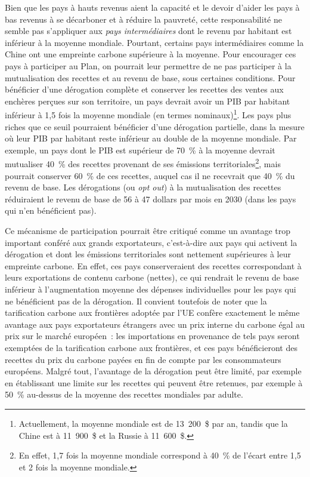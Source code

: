 \documentclass[a5paper,french,openany]{memoir}
\begin{document}
Bien que les pays à hauts revenus aient la capacité et le devoir d'aider les pays à bas revenus à se décarboner et à réduire la pauvreté, cette responsabilité ne semble pas s'appliquer aux \textit{pays intermédiaires} dont le revenu par habitant est inférieur à la moyenne mondiale. Pourtant, certains pays intermédiaires comme la Chine ont une empreinte carbone supérieure à la moyenne. Pour encourager ces pays à participer au Plan, on pourrait leur permettre de ne pas participer à la mutualisation des recettes et au revenu de base, sous certaines conditions. Pour bénéficier d'une dérogation complète et conserver les recettes des ventes aux enchères perçues sur son territoire, un pays devrait avoir un PIB par habitant inférieur à 1,5 fois la moyenne mondiale (en termes nominaux)\footnote{Actuellement, la moyenne mondiale est de 13~200~\$ par an, tandis que la Chine est à 11~900~\$ et la Russie à 11~600~\$.}. 
Les pays plus riches que ce seuil pourraient bénéficier d'une dérogation partielle, dans la mesure où leur PIB par habitant reste inférieur au double de la moyenne mondiale. Par exemple, un pays dont le PIB est supérieur de 70~\% à la moyenne devrait mutualiser 40~\% des recettes provenant de ses émissions territoriales\footnote{En effet, 1,7 fois la moyenne mondiale correspond à 40~\% de l'écart entre 1,5 et 2 fois la moyenne mondiale.}, mais pourrait conserver 60~\% de ces recettes, auquel cas il ne recevrait que 40~\% du revenu de base. Les dérogations (ou \textit{opt out}) à la mutualisation des recettes réduiraient le revenu de base de 56 à 47 dollars par mois en 2030 (dans les pays qui n'en bénéficient pas). 

Ce mécanisme de participation pourrait être critiqué comme un avantage trop important conféré aux grands exportateurs, c'est-à-dire aux pays qui activent la dérogation et dont les émissions territoriales sont nettement supérieures à leur empreinte carbone. En effet, ces pays conserveraient des recettes correspondant à leurs exportations de contenu carbone (nettes), ce qui rendrait le revenu de base inférieur à l'augmentation moyenne des dépenses individuelles pour les pays qui ne bénéficient pas de la dérogation. Il convient toutefois de noter que la tarification carbone aux frontières adoptée par l'UE confère exactement le même avantage aux pays exportateurs étrangers avec un prix interne du carbone égal au prix sur le marché européen~: les importations en provenance de tels pays seront exemptées de la tarification carbone aux frontières, et ces pays bénéficieront des recettes du prix du carbone payées en fin de compte par les consommateurs européens. Malgré tout, l'avantage de la dérogation peut être limité, par exemple en établissant une limite sur les recettes qui peuvent être retenues, par exemple à 50~\% au-dessus de la moyenne des recettes mondiales par adulte. %
\end{document}

